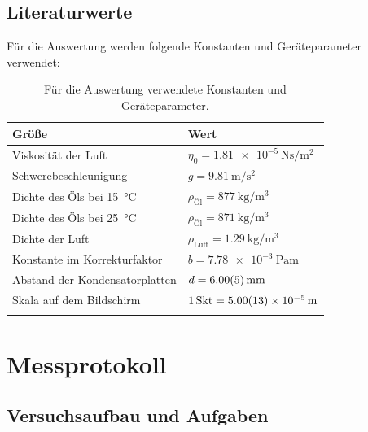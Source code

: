 \documentclass[12pt,a4paper,titlepage]{scrartcl}
\numberwithin{equation}{section}
\numberwithin{table}{section}
\numberwithin{figure}{section}
\begin{document}
\subsection{Literaturwerte}

Für die Auswertung werden folgende Konstanten und Geräteparameter verwendet:

\begin{table}[H]
    \centering
    \caption{Für die Auswertung verwendete Konstanten und Geräteparameter.}
    \begin{tabular}{ll}
        \toprule
        Größe & Wert \\
        \midrule
        Viskosität der Luft & $\eta_0 = \SI{1.81e-5}{\newton\second\per\meter\squared}$ \\
        Schwerebeschleunigung & $g = \SI{9.81}{\meter\per\second\squared}$ \\
        Dichte des Öls bei \SI{15}{\celsius} & $\rho_{\text{Öl}} = \SI{877}{\kilogram\per\meter\cubed}$ \\
        Dichte des Öls bei \SI{25}{\celsius} & $\rho_{\text{Öl}} = \SI{871}{\kilogram\per\meter\cubed}$ \\
        Dichte der Luft & $\rho_{\text{Luft}} = \SI{1.29}{\kilogram\per\meter\cubed}$ \\
        Konstante im Korrekturfaktor & $b = \SI{7.78e-3}{\pascal\meter}$ \\
        Abstand der Kondensatorplatten & $d = \SI{6.00 +- 0.05}{\milli\meter}$ \\
        Skala auf dem Bildschirm & $1\,\mathrm{Skt} = \SI{5.00 +- 0.13 e-5}{\meter}$ \\
        \bottomrule
        \label{constants}
    \end{tabular}
\end{table}





\section{Messprotokoll}

\subsection{Versuchsaufbau und Aufgaben}

\end{document}
